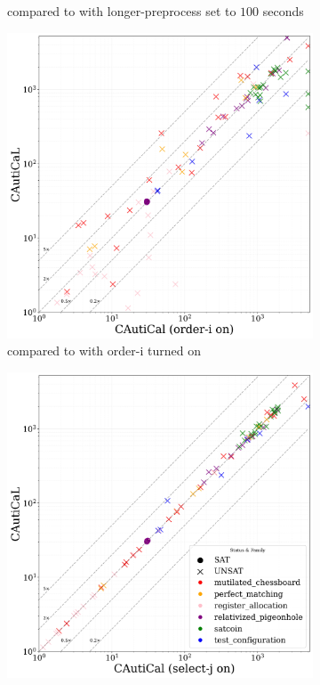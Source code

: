 \begin{figure}[!ht]
\begin{subfigure}[t]{0.3\textwidth}
        \caption{\tool compared to \tool with \textsf{longer-preprocess} set to $100$ seconds}
        \label{fig:global-time-limit}
    \end{subfigure}
    \hfill    
    \begin{subfigure}[t]{0.3\textwidth}
        \centering
        \includegraphics[width=\textwidth]{figs/globalisort_heuristic_comparison.jpg}
        \caption{\tool compared to \tool with \textsf{order-i} turned on}
        \label{fig:global-sort-i}
    \end{subfigure}
    \hfill
    \begin{subfigure}[t]{0.3\textwidth}
        \centering
        \includegraphics[width=\textwidth]{figs/globaltouch_heuristic_comparison.jpg}

\end{subfigure}
\end{figure}
